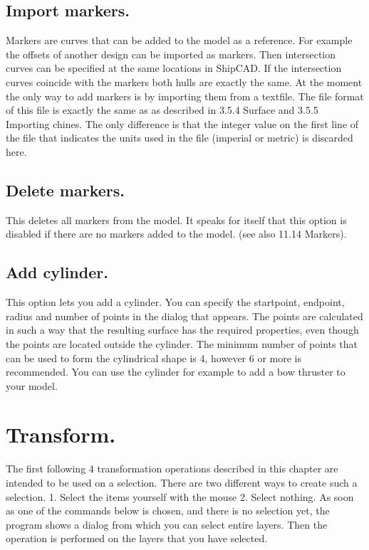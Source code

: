 \documentclass[12pt]{article}
\begin{document}
\subsection{Import markers.}
Markers are curves that can be added to the model as a reference. For example the offsets of
another design can be imported as markers. Then intersection curves can be specified at the same
locations in ShipCAD. If the intersection curves coincide with the markers both hulls are exactly
the same. At the moment the only way to add markers is by importing them from a textfile. The file
format of this file is exactly the same as as described in 3.5.4 Surface and 3.5.5 Importing chines.
The only difference is that the integer value on the first line of the file that indicates the units used in
the file (imperial or metric) is discarded here.

\subsection{Delete markers.}
This deletes all markers from the model. It speaks for itself that this option is disabled if there are no
markers added to the model. (see also 11.14 Markers).

\subsection{Add cylinder.}
This option lets you add a cylinder. You can specify the startpoint, endpoint, radius and number of
points in the dialog that appears. The points are calculated in such a way that the resulting surface
has the required properties, even though the points are located outside the cylinder. The minimum
number of points that can be used to form the cylindrical shape is 4, however 6 or more is
recommended. You can use the cylinder for example to add a bow thruster to your model.

\section{Transform.}
The first following 4 transformation operations described in this chapter are intended to be used on
a selection. There are two different ways to create such a selection.
1. Select the items yourself with the mouse
2. Select nothing. As soon as one of the commands below is chosen, and there is no
selection yet, the program shows a dialog from which you can select entire layers. Then the
operation is performed on the layers that you have selected.
\end{document}
